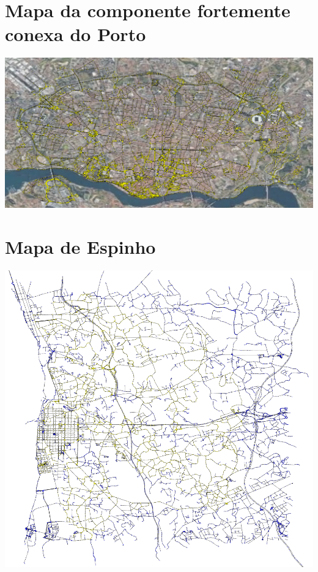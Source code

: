 \documentclass[12pt,a4paper]{report}
\begin{document}
\section{Mapa da componente fortemente conexa do Porto}
\includegraphics[width=1.0\textwidth]{./imgs/scc/portoStrongSCC.png}


\section{Mapa de Espinho}
\includegraphics[width=1.0\textwidth]{./imgs/scc/espinhoSCC.png}
\end{document}
